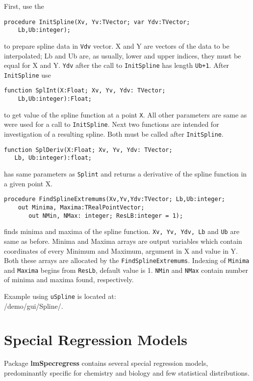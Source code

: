 \documentclass[12pt,a4paper,oneside]{article}
\newcommand{\code}[1]{\texttt{#1}}
\begin{document}
First, use the \vspace{-2pt}
\begin{verbatim}
procedure InitSpline(Xv, Yv:TVector; var Ydv:TVector;
    Lb,Ub:integer);
\end{verbatim} \vspace{-2pt}
to prepare spline data in \code{Vdv} vector. X and Y are vectors of the data to be interpolated; Lb and Ub are, as usually, lower and upper indices, they must be equal for X and Y. \code{Ydv} after the call to \code{InitSpline} has length \code{Ub+1}. After \code{InitSpline} use \vspace{-4pt} 
\begin{verbatim}
function SplInt(X:Float; Xv, Yv, Ydv: TVector;
    Lb,Ub:integer):Float;
\end{verbatim}\vspace{-2pt}
to get value of the spline function at a point \code{X}. 
All other parameters are same as were used for a call to \code{InitSpline}.
Next two functions are intended for investigation of a resulting spline. Both must be called after \code{InitSpline}.\vspace{-2pt}
\begin{verbatim}
function SplDeriv(X:Float; Xv, Yv, Ydv: TVector; 
   Lb, Ub:integer):float;
\end{verbatim}\vspace{-2pt}
has same parameters as \code{Splint} and returns a derivative of the spline function in a given point X.\vspace{-2pt}
\begin{verbatim}
procedure FindSplineExtremums(Xv,Yv,Ydv:TVector; Lb,Ub:integer;
    out Minima, Maxima:TRealPointVector; 
       out NMin, NMax: integer; ResLB:integer = 1);
\end{verbatim}\vspace{-2pt}
finds minima and maxima of the spline function. \code{Xv, Yv, Ydv, Lb} and \code{Ub} are same as before. Minima and Maxima arrays are output variables which contain coordinates of every Minimum and Maximum, argument in X and value in Y. Both these arrays are allocated by the \code{FindSplineExtremums}. Indexing of \code{Minima} and \code{Maxima} begins from \code{ResLb}, default value is 1. \code{NMin} and \code{NMax} contain number of minima and maxima found, respectively. 

Example using \code{uSpline} is located at:\\
/demo/gui/Spline/.  
\section{Special Regression Models}
Package \textbf{lmSpecregress} contains several special regression models, predominantly specific for chemistry and biology and few statistical distributions. 
\end{document}
